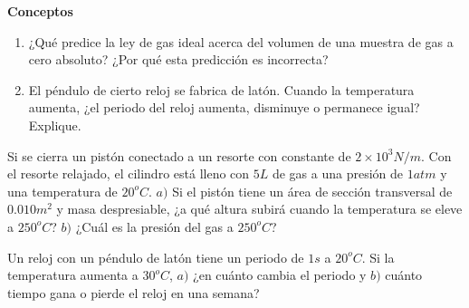 \begin{mdframed}[style=warning]
	\textbf{Conceptos}
		\begin{enumerate}
			\item ¿Qué predice la ley de gas ideal acerca del volumen de una muestra de gas a cero absoluto? ¿Por qué esta predicción es incorrecta?
			\item El péndulo de cierto reloj se fabrica de latón. Cuando la temperatura aumenta, ¿el periodo del reloj aumenta, disminuye o permanece igual? Explique.
		\end{enumerate}
\end{mdframed}



















\begin{mdframed}[style=warning]
	\begin{ejercicio}
		Si se cierra un pistón conectado a un resorte con constante de $2\times 10^3 N/m$. Con el resorte relajado, el cilindro está lleno con $5L$ de gas a una presión de $1atm$ y una temperatura de $20^o C$. $a)$ Si el pistón tiene un área de sección transversal de $0.010m^2$ y masa despresiable, ¿a qué altura subirá cuando la temperatura se eleve a $250^o C$? $b)$ ¿Cuál es la presión del gas a $250^oC$?
	\end{ejercicio}
\end{mdframed}


























\begin{mdframed}[style=warning]
	\begin{ejercicio}
		Un reloj con un péndulo de latón tiene un periodo de $1s$ a $20^o C$. Si la temperatura aumenta a $30^o C$, $a)$ ¿en cuánto cambia el periodo y $b)$ cuánto tiempo gana o pierde el reloj en una semana?
	\end{ejercicio}
\end{mdframed}


















